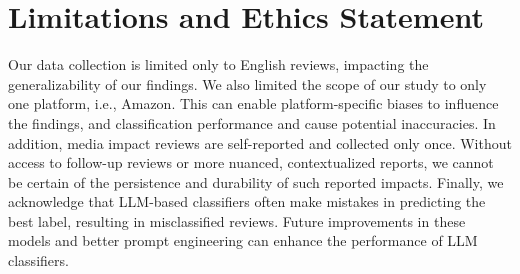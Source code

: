 


\section{Limitations and Ethics Statement}
Our data collection is limited only to English reviews, impacting the generalizability of our findings.
We also limited the scope of our study to only one platform, i.e., Amazon. This can enable platform-specific biases to influence the findings, and classification performance and cause potential inaccuracies.
In addition, media impact reviews are self-reported and collected only once. Without access to follow-up reviews or more nuanced, contextualized reports, we cannot be certain of the persistence and durability of such reported impacts. 
Finally, we acknowledge that LLM-based classifiers often make mistakes in predicting the best label, resulting in misclassified reviews. Future improvements in these models and better prompt engineering can enhance the performance of LLM classifiers. 


